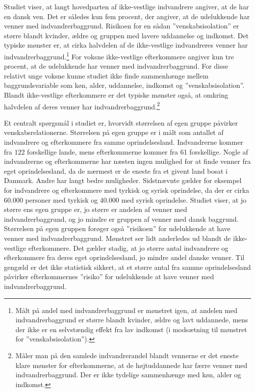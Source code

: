 \documentclass[
]{book}
\begin{document}
Studiet viser, at langt hovedparten af ikke-vestlige indvandrere angiver, at de har en dansk ven. Det er således kun fem procent, der angiver, at de udelukkende har venner med indvandrerbaggrund. Risikoen for en sådan ''venskabsisolation'' er større blandt kvinder, ældre og gruppen med lavere uddannelse og indkomst. Det typiske mønster er, at cirka halvdelen af de ikke-vestlige indvandreres venner har indvandrerbaggrund.\footnote{Målt på andel med indvandrerbaggrund er mønstret igen, at andelen med indvandrerbaggrund er større blandt kvinder, ældre og lavt uddannede, mens der ikke er en selvstændig effekt fra lav indkomst (i modsætning til mønstret for ''venskabsisolation'').} For voksne ikke-vestlige efterkommere angiver kun tre procent, at de udelukkende har venner med indvandrerbaggrund. For disse relativt unge voksne kunne studiet ikke finde sammenhænge mellem baggrundsvariable som køn, alder, uddannelse, indkomst og ''venskabsisolation''. Blandt ikke-vestlige efterkommere er det typiske mønster også, at omkring halvdelen af deres venner har indvandrerbaggrund.\footnote{Måler man på den samlede indvandrerandel blandt vennerne er det eneste klare mønster for efterkommerne, at de højtuddannede har færre venner med indvandrerbaggrund. Der er ikke tydelige sammenhænge med køn, alder og indkomst.}

Et centralt spørgsmål i studiet er, hvorvidt størrelsen af egen gruppe påvirker venskabsrelationerne. Størrelsen på egen gruppe er i målt som antallet af indvandrere og efterkommere fra samme oprindelsesland. Indvandrerne kommer fra 122 forskellige lande, mens efterkommerne kommer fra 61 forskellige. Nogle af indvandrerne og efterkommerne har næsten ingen mulighed for at finde venner fra eget oprindelsesland, da de nærmest er de eneste fra et givent land bosat i Danmark. Andre har langt bedre muligheder. Sidstnævnte gælder for eksempel for indvandrere og efterkommere med tyrkisk og syrisk oprindelse, da der er cirka 60.000 personer med tyrkisk og 40.000 med syrisk oprindelse. Studiet viser, at jo større ens egen gruppe er, jo større er andelen af venner med indvandrerbaggrund, og jo mindre er gruppen af venner med dansk baggrund. Størrelsen på egen gruppen forøger også ''risikoen'' for udelukkende at have venner med indvandrerbaggrund. Mønstret ser lidt anderledes ud blandt de ikke-vestlige efterkommere. Det gælder stadig, at jo større antal indvandrere og efterkommere fra deres eget oprindelsesland, jo mindre andel danske venner. Til gengæld er det ikke statistisk sikkert, at et større antal fra samme oprindelsesland påvirker efterkommernes ''risiko'' for udelukkende at have venner med indvandrerbaggrund.
\end{document}
